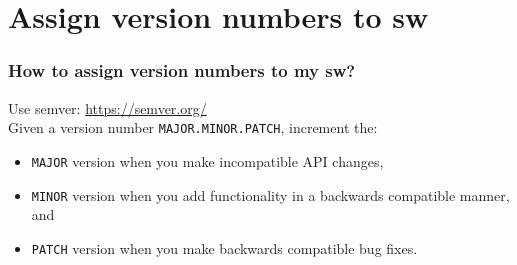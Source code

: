 \documentclass[pdf]{beamer}
\newcommand{\mono}[1]{\texttt{#1}}
\begin{document}
\section{Assign version numbers to sw}
\begin{frame}
  \frametitle{How to assign version numbers to my sw?}
  Use semver: \url{https://semver.org/}\\
  Given a version number \mono{MAJOR.MINOR.PATCH}, increment the:
  \begin{itemize}
    \item \mono{MAJOR} version when you make incompatible API changes,
    \item \mono{MINOR} version when you add functionality in a backwards compatible manner, and
    \item \mono{PATCH} version when you make backwards compatible bug fixes.
  \end{itemize}
\end{frame}
\end{document}

